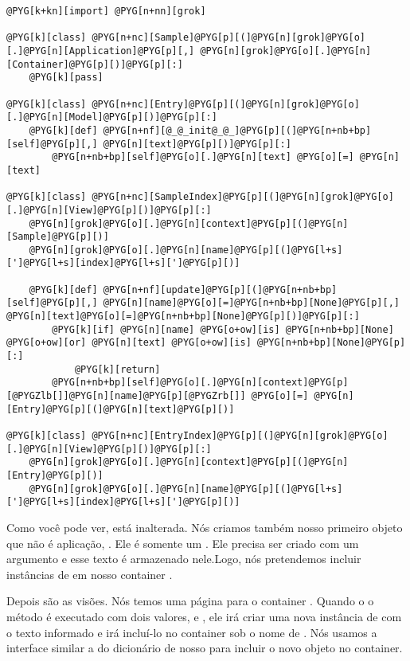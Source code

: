 \documentclass[a4paper,12pt,portuguese]{manual}
\begin{document}
\begin{Verbatim}[commandchars=@\[\]]
@PYG[k+kn][import] @PYG[n+nn][grok]

@PYG[k][class] @PYG[n+nc][Sample]@PYG[p][(]@PYG[n][grok]@PYG[o][.]@PYG[n][Application]@PYG[p][,] @PYG[n][grok]@PYG[o][.]@PYG[n][Container]@PYG[p][)]@PYG[p][:]
    @PYG[k][pass]

@PYG[k][class] @PYG[n+nc][Entry]@PYG[p][(]@PYG[n][grok]@PYG[o][.]@PYG[n][Model]@PYG[p][)]@PYG[p][:]
    @PYG[k][def] @PYG[n+nf][@_@_init@_@_]@PYG[p][(]@PYG[n+nb+bp][self]@PYG[p][,] @PYG[n][text]@PYG[p][)]@PYG[p][:]
        @PYG[n+nb+bp][self]@PYG[o][.]@PYG[n][text] @PYG[o][=] @PYG[n][text]

@PYG[k][class] @PYG[n+nc][SampleIndex]@PYG[p][(]@PYG[n][grok]@PYG[o][.]@PYG[n][View]@PYG[p][)]@PYG[p][:]
    @PYG[n][grok]@PYG[o][.]@PYG[n][context]@PYG[p][(]@PYG[n][Sample]@PYG[p][)]
    @PYG[n][grok]@PYG[o][.]@PYG[n][name]@PYG[p][(]@PYG[l+s][']@PYG[l+s][index]@PYG[l+s][']@PYG[p][)]

    @PYG[k][def] @PYG[n+nf][update]@PYG[p][(]@PYG[n+nb+bp][self]@PYG[p][,] @PYG[n][name]@PYG[o][=]@PYG[n+nb+bp][None]@PYG[p][,] @PYG[n][text]@PYG[o][=]@PYG[n+nb+bp][None]@PYG[p][)]@PYG[p][:]
        @PYG[k][if] @PYG[n][name] @PYG[o+ow][is] @PYG[n+nb+bp][None] @PYG[o+ow][or] @PYG[n][text] @PYG[o+ow][is] @PYG[n+nb+bp][None]@PYG[p][:]
            @PYG[k][return]
        @PYG[n+nb+bp][self]@PYG[o][.]@PYG[n][context]@PYG[p][@PYGZlb[]]@PYG[n][name]@PYG[p][@PYGZrb[]] @PYG[o][=] @PYG[n][Entry]@PYG[p][(]@PYG[n][text]@PYG[p][)]

@PYG[k][class] @PYG[n+nc][EntryIndex]@PYG[p][(]@PYG[n][grok]@PYG[o][.]@PYG[n][View]@PYG[p][)]@PYG[p][:]
    @PYG[n][grok]@PYG[o][.]@PYG[n][context]@PYG[p][(]@PYG[n][Entry]@PYG[p][)]
    @PYG[n][grok]@PYG[o][.]@PYG[n][name]@PYG[p][(]@PYG[l+s][']@PYG[l+s][index]@PYG[l+s][']@PYG[p][)]
\end{Verbatim}

Como você pode ver,  está inalterada. Nós criamos também
nosso primeiro objeto que não é aplicação, . Ele é somente
um . Ele precisa ser criado com um argumento 
e esse texto é armazenado nele.Logo, nós pretendemos incluir instâncias de
 em nosso container .

Depois são as visões. Nós temos uma página  para o
container . Quando o o método  é executado com
dois valores,  e , ele irá criar uma nova instância de
 com o texto informado e irá incluí-lo no container sob o nome
de . Nós usamos a interface similar a do  dicionário de nosso
 para incluir o novo objeto  no container.
\end{document}

